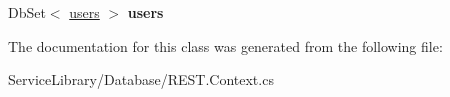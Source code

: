 \begin{DoxyCompactItemize}
\item 
\hypertarget{class_service_library_1_1_database_1_1_rest_entities_a00aa8a90a5886f687c500f378e96adb5}{Db\-Set$<$ \hyperlink{class_service_library_1_1_database_1_1users}{users} $>$ {\bfseries users}}\label{class_service_library_1_1_database_1_1_rest_entities_a00aa8a90a5886f687c500f378e96adb5}

\end{DoxyCompactItemize}


The documentation for this class was generated from the following file\-:\begin{DoxyCompactItemize}
\item 
Service\-Library/\-Database/R\-E\-S\-T.\-Context.\-cs\end{DoxyCompactItemize}

